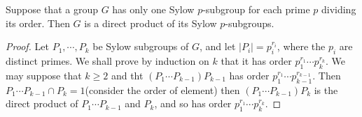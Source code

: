 \begin{corollary}
  Suppose that a group \( G \) has only one Sylow \( p \)-subgroup for each prime \( p \) dividing its order.
  Then \( G \) is a direct product of its Sylow \( p \)-subgroups.
\end{corollary}
\begin{proof}
  Let \( P_1, \cdots, P_k \) be Sylow subgroups of \( G \), and let \( \left\vert P_i \right\vert = p^{r_i}_i \), where the \( p_i \) are distinct primes.
  We shall prove by induction on \( k \) that it has order \( p^{r_1}_1 \cdots p^{r_k}_k \).
  We may suppose that \( k \geq 2 \) and tht \((P_1 \cdots P_{k - 1})P_{k - 1}\) has order \( p^{r_1}_1\cdots p^{r_{k - 1}}_{k - 1} \).
  Then \( P_1 \cdots P_{k - 1} \cap P_k = 1 \)(consider the order of element) then \( (P_1 \cdots P_{k - 1})P_k \) is the direct product of \( P_1 \cdots P_{k - 1} \) and \( P_k \), and so has order \( p^{r_1}_1 \cdots p^{r_k}_k \).
\end{proof}
